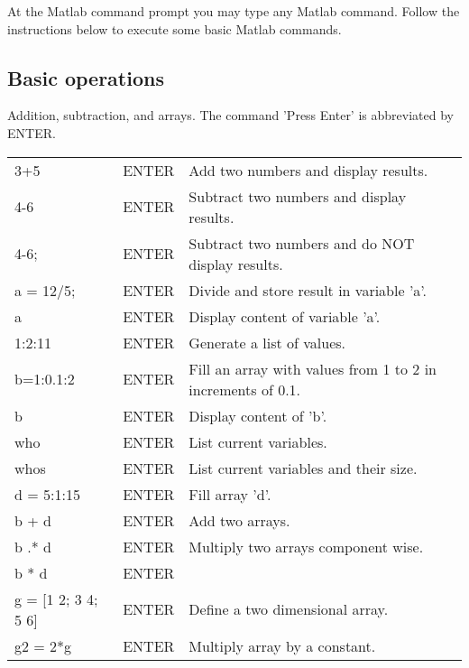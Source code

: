 At the Matlab command prompt you may type any Matlab command.  Follow the
instructions below to execute some basic Matlab commands.
\vspace{0.25in}

\subsection{Basic operations} Addition, subtraction, and arrays.  The 
command 'Press Enter' is abbreviated by ENTER. \\
\vspace{1in}


\begin{tabular}{lll} 
  \ttt{>>} 3+5     &ENTER   &Add two numbers and display results. \\ 
  \ttt{>>} 4-6     &ENTER   &Subtract two numbers and display results. \\ 
  \ttt{>>} 4-6;    &ENTER   &Subtract two numbers and do NOT
  display results.\\
  \ttt{>>} a = 12/5; &ENTER   &Divide and store result in variable 'a'.\\
  \ttt{>>} a        &ENTER  &Display content of variable 'a'. \\
  \ttt{>>} 1:2:11   &ENTER  &Generate a list of values. \\
  \ttt{>>} b=1:0.1:2 &ENTER & Fill an array with values from 1 to
  2 in increments of 0.1.\\
  \ttt{>>} b          &ENTER & Display content of 'b'. \\
  \ttt{>>} who      &ENTER  &List current variables. \\
  \ttt{>>} whos     &ENTER  &List current variables and their size.\\
  \ttt{>>} d = 5:1:15 &ENTER &Fill array 'd'. \\
  \ttt{>>} b + d     &ENTER &Add two arrays. \\
  \ttt{>>} b .* d    &ENTER & Multiply two arrays component wise. \\
  \ttt{>>} b * d     &ENTER & \\ 
  \ttt{>>} g = [1 2; 3 4; 5 6] &ENTER &Define a two dimensional array. \\
  \ttt{>>} g2 = 2*g  &ENTER & Multiply array by a constant. \\
\end{tabular}

